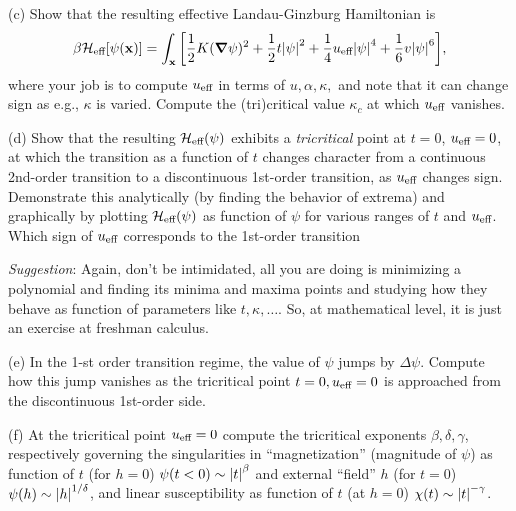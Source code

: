 \documentclass[12pt]{article}
\begin{document}
\begin{problem}{5}
(c) Show that the resulting effective Landau-Ginzburg Hamiltonian is
\begin{equation}
    \beta\mathcal{H}_{\text{eff}}[\psi(\vb{x})]
    =\int_{\vb{x}}\qty[\frac12K(\grad\psi)^2+\frac12t\abs{\psi}^2
    +\frac14u_{\text{eff}}\abs{\psi}^4+\frac16v\abs{\psi}^6],
\end{equation}
where your job is to compute $u_{\text{eff}}$ in terms of $u,\alpha,\kappa,$ and note
that it can change sign as e.g., $\kappa$ is varied. Compute the (tri)critical
value $\kappa_c$ at which $u_{\text{eff}}$ vanishes.

(d) Show that the resulting $\mathcal{H}_{\text{eff}}(\psi)$ exhibits a \textit{tricritical}
point at $t=0$, $u_{\text{eff}}=0$, at which the transition as a function of $t$
changes character from a continuous 2nd-order transition to a discontinuous
1st-order transition, as $u_{\text{eff}}$ changes sign. Demonstrate this analytically
(by finding the behavior of extrema) and graphically by plotting
$\mathcal{H}_{\text{eff}}(\psi)$ as function of $\psi$ for various ranges of $t$ and
$u_{\text{eff}}$. Which sign of $u_{\text{eff}}$ corresponds to the 1st-order transition

\textit{Suggestion}: Again, don't be intimidated, all you are doing is
minimizing a polynomial and finding its minima and maxima points and studying
how they behave as function of parameters like $t,\kappa,\hdots$. So, at
mathematical level, it is just an exercise at freshman calculus.

(e) In the 1-st order transition regime, the value of $\psi$ jumps by
$\Delta\psi$. Compute how this jump vanishes as the tricritical point
$t=0,u_{\text{eff}}=0$ is approached from the discontinuous 1st-order side.

(f) At the tricritical point $u_{\text{eff}}=0$ compute the tricritical exponents
$\beta,\delta,\gamma$, respectively governing the singularities in
``magnetization'' (magnitude of $\psi$) as function of $t$ (for $h=0$)
$\psi(t<0)\sim \abs{t}^\beta$ and external ``field'' $h$ (for $t=0$)
$\psi(h)\sim \abs{h}^{1/\delta}$, and linear susceptibility as function of $t$
(at $h=0$) $\chi(t)\sim\abs{t}^{-\gamma}$.
\begin{solution}
\end{solution}
\end{problem}
\newpage
\end{document}
